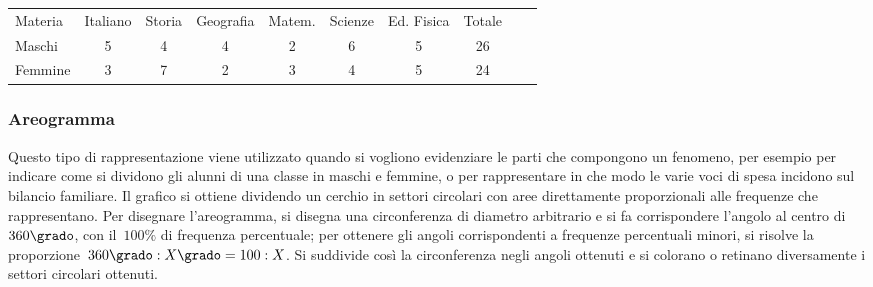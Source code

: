 \vspace*{-6pt}
\begin{center}
 \begin{tabularx}{.95\textwidth}{X*{7}{c}Xc}
\toprule
Materia& Italiano &Storia & Geografia & Matem. & Scienze & Ed. Fisica & 
Totale\\
Maschi & 5 & 4& 4 & 2& 6 & 5& 26\\
Femmine & 3 & 7 & 2 & 3  & 4 & 5 & 24\\
\bottomrule
\end{tabularx}
\end{center}

\subsubsection{Areogramma}
Questo tipo di rappresentazione viene utilizzato quando si vogliono 
evidenziare le parti che compongono un fenomeno, per esempio per indicare
come si dividono gli alunni di una classe in maschi e femmine, o per 
rappresentare in che modo
le varie voci di spesa incidono sul bilancio familiare.
Il grafico si ottiene dividendo un cerchio in settori circolari con aree 
direttamente proporzionali alle frequenze che rappresentano.
Per disegnare l'areogramma, si disegna una circonferenza di diametro 
arbitrario e si fa corrispondere l'angolo al centro di~$360\grado$,
con il~$100\%$ di frequenza percentuale; per ottenere gli angoli 
corrispondenti a frequenze percentuali minori, si risolve la 
proporzione~$360\grado:X\grado=100:X$.
Si suddivide così la circonferenza negli angoli ottenuti e si colorano o 
retinano diversamente i settori circolari ottenuti.

